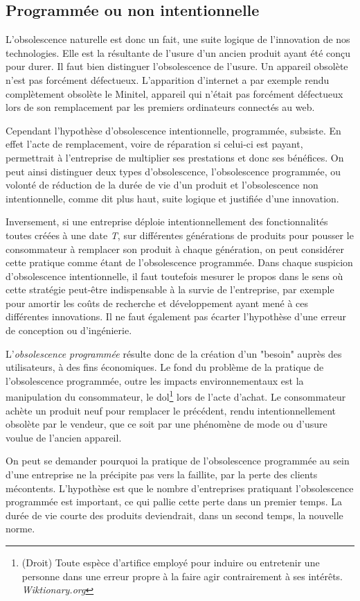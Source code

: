 \subsection{Programmée ou non intentionnelle}

L'obsolescence naturelle est donc un fait, une suite logique de l'innovation de nos technologies. Elle est la résultante de l'usure d'un ancien produit ayant été conçu pour durer.
Il faut bien distinguer l’obsolescence de l’usure. Un appareil obsolète n’est pas forcément défectueux. L’apparition d’internet a par exemple rendu complètement obsolète le Minitel, appareil qui n'était pas forcément défectueux lors de son remplacement par les premiers ordinateurs connectés au web. 

\bigbreak
Cependant l'hypothèse d'obsolescence intentionnelle, programmée, subsiste. 
En effet l'acte de remplacement, voire de réparation si celui-ci est payant, permettrait à l'entreprise de multiplier ses prestations et donc ses bénéfices. 
On peut ainsi distinguer deux types d'obsolescence, l'obsolescence programmée, ou volonté de réduction de la durée de vie d’un produit et l'obsolescence non intentionnelle, comme dit plus haut, suite logique et justifiée d’une innovation.

\bigbreak
Inversement, si une entreprise déploie intentionnellement des fonctionnalités toutes créées à une date \textit{T}, sur différentes générations de produits pour pousser le consommateur à remplacer son produit à chaque génération, on peut considérer cette pratique comme étant de l'obsolescence programmée. Dans chaque suspicion d’obsolescence intentionnelle, il faut toutefois mesurer le propos dans le sens où cette stratégie peut-être indispensable à la survie de l’entreprise, par exemple pour amortir les coûts de recherche et développement ayant mené à ces différentes innovations. Il ne faut également pas écarter l’hypothèse d’une erreur de conception ou d'ingénierie.

\medbreak
L'\textit{obsolescence programmée} résulte donc de la création d'un "besoin" auprès des utilisateurs, à des fins économiques. Le fond du problème de la pratique de l'obsolescence programmée, outre les impacts environnementaux est la manipulation du consommateur, le dol\footnote{(Droit) Toute espèce d’artifice employé pour induire ou entretenir une personne dans une erreur propre à la faire agir contrairement à ses intérêts. \textit{Wiktionary.org}} lors de l'acte d'achat. Le consommateur achète un produit neuf pour remplacer le précédent, rendu intentionnellement obsolète par le vendeur, que ce soit par une phénomène de mode ou d'usure voulue de l’ancien appareil.%

\bigbreak
On peut se demander pourquoi la pratique de l’obsolescence programmée au sein d’une entreprise ne la précipite pas vers la faillite, par la perte des clients mécontents. L’hypothèse est que le nombre d’entreprises pratiquant l’obsolescence programmée est important, ce qui pallie cette perte dans un premier temps. La durée de vie courte des produits deviendrait, dans un second temps, la nouvelle norme.
